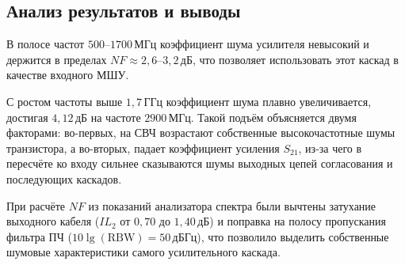 \subsection{Анализ результатов и выводы}

В полосе частот $500\text{--}1700$\,МГц коэффициент шума усилителя невысокий и держится в пределах $NF \approx 2{,}6\text{--}3{,}2$\,дБ, что позволяет использовать этот каскад в качестве входного МШУ. 

С ростом частоты выше $1{,}7$\,ГГц коэффициент шума плавно увеличивается, достигая $4{,}12$\,дБ на частоте $2900$\,МГц. Такой подъём объясняется двумя факторами: во-первых, на СВЧ возрастают собственные высокочастотные шумы транзистора, а во-вторых, падает коэффициент усиления $S_{21}$, из-за чего в пересчёте ко входу сильнее сказываются шумы выходных цепей согласования и последующих каскадов.

При расчёте $NF$ из показаний анализатора спектра были вычтены затухание выходного кабеля ($IL_2$ от $0{,}70$ до $1{,}40$\,дБ) и поправка на полосу пропускания фильтра ПЧ ($10\lg(\text{RBW}) = 50$\,дБГц), что позволило выделить собственные шумовые характеристики самого усилительного каскада.
